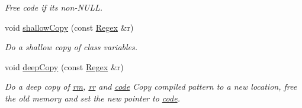 \begin{DoxyCompactItemize}
\begin{DoxyCompactList}\small\item\em Free code if it\textquotesingle{}s non-\/\+N\+U\+LL. \end{DoxyCompactList}\item 
void \hyperlink{classjpcre2_1_1Regex_a24594d3bdb08b3795080c68019928f3a}{shallow\+Copy} (const \hyperlink{classjpcre2_1_1Regex}{Regex} \&r)\hypertarget{classjpcre2_1_1Regex_a24594d3bdb08b3795080c68019928f3a}{}\label{classjpcre2_1_1Regex_a24594d3bdb08b3795080c68019928f3a}

\begin{DoxyCompactList}\small\item\em Do a shallow copy of class variables. \end{DoxyCompactList}\item 
void \hyperlink{classjpcre2_1_1Regex_acaa5da5fc3ad903e3ecc724750214e07}{deep\+Copy} (const \hyperlink{classjpcre2_1_1Regex}{Regex} \&r)
\begin{DoxyCompactList}\small\item\em Do a deep copy of \hyperlink{classjpcre2_1_1Regex_a447925705d222dbbd8c7d60b98cc65f0}{rm}, \hyperlink{classjpcre2_1_1Regex_a5a7ac6c6288988079b8933b4b6637fab}{rr} and \hyperlink{classjpcre2_1_1Regex_a2742264206d8976c413b474b7bac4b2e}{code} Copy compiled pattern to a new location, free the old memory and set the new pointer to \hyperlink{classjpcre2_1_1Regex_a2742264206d8976c413b474b7bac4b2e}{code}. \end{DoxyCompactList}\end{DoxyCompactItemize}
